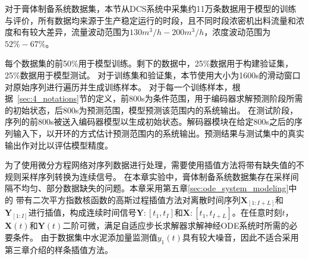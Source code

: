 对于膏体制备系统数据集，本节从DCS系统中采集约11万条数据用于模型的训练与评价，所有数据均来源于生产稳定运行的时段，且不同时段浓密机出料流量和浓度和有较大差异，流量波动范围为$130m^3/h-200m^3/h$，浓度波动范围为$52\%-67\%$。

每个数据集的前50\%用于模型训练。剩下的数据中，25\%数据用于构建验证集，25\%数据用于模型测试。
对于训练集和验证集，本节使用大小为1600s的滑动窗口对原始序列进行遍历并生成训练样本。
对于每一个训练样本，根据~\ref{sec:4_notations}节的定义，前800s为条件范围，用于编码器求解预测阶段所需的初始状态，后800s为预测范围，模型预测该范围内的系统输出。
在测试阶段，序列的前800s被送入编码器模型以生成初始状态。解码器模块在给定800s之后的序列输入下，以开环的方式估计预测范围内的系统输出。预测结果与测试集中的真实输出作对比以评估模型精度。

为了使用微分方程网络对序列数据进行处理，需要使用插值方法将带有缺失值的不规则采样序列转换为连续信号。
在本章实验中，膏体制备系统数据集存在采样间隔不均匀、部分数据缺失的问题。本章采用第五章\ref{sec:ode_system_modeling}中的
带有二次平方指数核函数的高斯过程插值方法对离散时间序列$\boldsymbol X_{[1:I+L]}$和$\boldsymbol Y_{[1:I]}$进行插值，构成连续时间信号$\boldsymbol Y:[t_1,t_{I}]$和$\boldsymbol X:[t_1,t_{I+L}]$。在任意时刻$t$，  $\boldsymbol X(t)$和$\boldsymbol Y(t)$二阶可微，满足自适应步长求解器求解神经ODE系统时所需的必要条件\cite{kidger2020neural}。
由于数据集中水泥添加量监测值$y_1(t)$具有较大噪音，因此不适合采用第三章介绍的样条插值方法。


